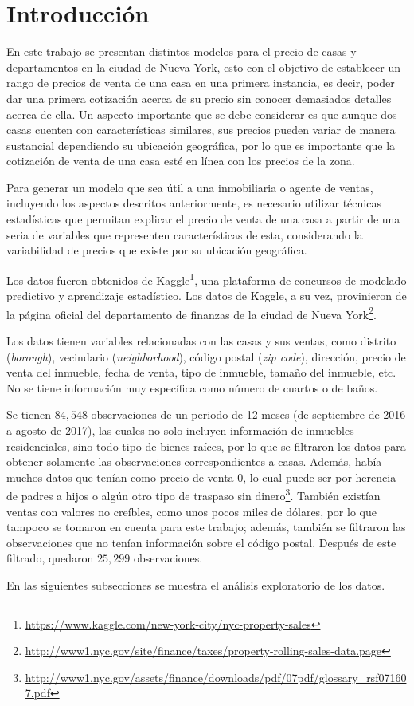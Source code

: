 
\section{Introducción}
\label{sec:intro}

En este trabajo se presentan distintos modelos para el precio de casas y departamentos en la ciudad de Nueva York, esto con el objetivo de establecer un rango de precios de venta de una casa en una primera instancia, es decir, poder dar una primera cotización acerca de su precio sin conocer demasiados detalles acerca de ella. Un aspecto importante que se debe considerar es que aunque dos casas cuenten con características similares, sus precios pueden variar de manera sustancial dependiendo su ubicación geográfica, por lo que es importante que la cotización de venta de una casa esté en línea con los precios de la zona.

Para generar un modelo que sea útil a una inmobiliaria o agente de ventas, incluyendo  los aspectos descritos anteriormente, es necesario utilizar técnicas estadísticas que permitan explicar el precio de venta de una casa a partir de una seria de variables que representen características de esta, considerando la variabilidad de precios que existe por su ubicación geográfica.

Los datos fueron obtenidos de Kaggle\footnote{\url{https://www.kaggle.com/new-york-city/nyc-property-sales}}, una plataforma de concursos de modelado predictivo y aprendizaje estadístico. Los datos de Kaggle, a su vez, provinieron de la página oficial del departamento de finanzas de la ciudad de Nueva York\footnote{\url{http://www1.nyc.gov/site/finance/taxes/property-rolling-sales-data.page}}.

Los datos tienen variables relacionadas con las casas y sus ventas, como distrito (\textit{borough}), vecindario (\textit{neighborhood}), código postal (\textit{zip code}), dirección, precio de venta del inmueble, fecha de venta, tipo de inmueble, tamaño del inmueble, etc. No se tiene información muy específica como número de cuartos o de baños.

Se tienen $84,548$ observaciones de un periodo de 12 meses (de septiembre de 2016 a agosto de 2017), las cuales no solo incluyen información de inmuebles residenciales, sino todo tipo de bienes raíces, por lo que se filtraron los datos para obtener solamente las observaciones correspondientes a casas. Además, había muchos datos que tenían como precio de venta 0, lo cual puede ser por herencia de padres a hijos o algún otro tipo de traspaso sin dinero\footnote{\url{http://www1.nyc.gov/assets/finance/downloads/pdf/07pdf/glossary_rsf071607.pdf}}. También existían ventas con valores no creíbles, como unos pocos miles de dólares, por lo que tampoco se tomaron en cuenta para este trabajo; además, también se filtraron las observaciones que no tenían información sobre el código postal. Después de este filtrado, quedaron $25,299$ observaciones.

En las siguientes subsecciones se muestra el análisis exploratorio de los datos.